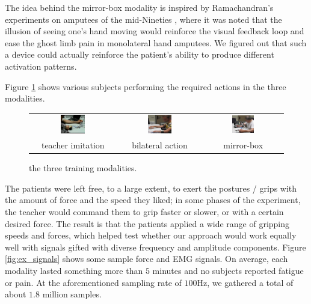 The idea behind the mirror-box modality is inspired by Ramachandran's
experiments on amputees of the mid-Nineties \cite{ramachandran}, where
it was noted that the illusion of seeing one's hand moving would
reinforce the visual feedback loop and ease the ghost limb pain in
monolateral hand amputees. We figured out that such a device could
actually reinforce the patient's ability to produce different
activation patterns.

Figure \ref{fig:modalities} shows various subjects performing the
required actions in the three modalities.

\begin{figure}[!ht] \centering
  \begin{tabular}{ccc}
    \includegraphics[width=0.3\textwidth]{figs/mod1} &
    \includegraphics[width=0.3\textwidth]{figs/mod2} &
    \includegraphics[width=0.3\textwidth]{figs/mod3} \\
    teacher imitation & bilateral action & mirror-box \\
  \end{tabular}
  \caption{the three training modalities.}
  \label{fig:modalities}
\end{figure}

The patients were left free, to a large extent, to exert the postures
/ grips with the amount of force and the speed they liked; in some
phases of the experiment, the teacher would command them to grip
faster or slower, or with a certain desired force. The result is that
the patients applied a wide range of gripping speeds and forces, which
helped test whether our approach would work equally well with signals
gifted with diverse frequency and amplitude components. Figure
\ref{fig:ex_signals} shows some sample force and EMG signals. On
average, each modality lasted something more than $5$ minutes and no
subjects reported fatigue or pain. At the aforementioned sampling rate
of $100$Hz, we gathered a total of about $1.8$ million samples.

